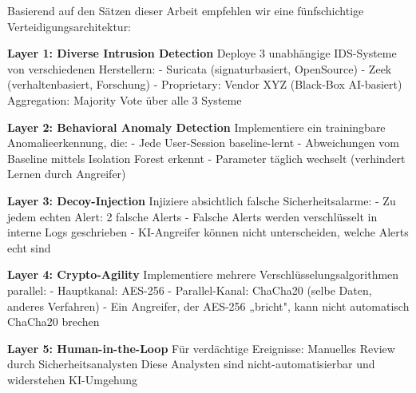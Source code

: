 \documentclass[a4paper,12pt]{article}
\theoremstyle{definition}
\begin{document}
Basierend auf den Sätzen dieser Arbeit empfehlen wir eine fünfschichtige Verteidigungsarchitektur:

\begin{algorithm}[h]
\caption{Redundante KI-resiliente Sicherheitsarchitektur für Bechtle}
\label{alg:bechtle_defense}
\begin{algorithmic}[1]
\State \textbf{Layer 1: Diverse Intrusion Detection}
\State Deploye 3 unabhängige IDS-Systeme von verschiedenen Herstellern:
\State \quad - Suricata (signaturbasiert, OpenSource)
\State \quad - Zeek (verhaltenbasiert, Forschung)
\State \quad - Proprietary: Vendor XYZ (Black-Box AI-basiert)
\State Aggregation: Majority Vote über alle 3 Systeme

\State \textbf{Layer 2: Behavioral Anomaly Detection}
\State Implementiere ein trainingbare Anomalieerkennung, die:
\State \quad - Jede User-Session baseline-lernt
\State \quad - Abweichungen vom Baseline mittels Isolation Forest erkennt
\State \quad - Parameter täglich wechselt (verhindert Lernen durch Angreifer)

\State \textbf{Layer 3: Decoy-Injection}
\State Injiziere absichtlich falsche Sicherheitsalarme:
\State \quad - Zu jedem echten Alert: 2 falsche Alerts
\State \quad - Falsche Alerts werden verschlüsselt in interne Logs geschrieben
\State \quad - KI-Angreifer können nicht unterscheiden, welche Alerts echt sind

\State \textbf{Layer 4: Crypto-Agility}
\State Implementiere mehrere Verschlüsselungsalgorithmen parallel:
\State \quad - Hauptkanal: AES-256
\State \quad - Parallel-Kanal: ChaCha20 (selbe Daten, anderes Verfahren)
\State \quad - Ein Angreifer, der AES-256 „bricht", kann nicht automatisch ChaCha20 brechen

\State \textbf{Layer 5: Human-in-the-Loop}
\State Für verdächtige Ereignisse: Manuelles Review durch Sicherheitsanalysten
\State Diese Analysten sind nicht-automatisierbar und widerstehen KI-Umgehung
\end{algorithmic}
\end{algorithm}
\end{document}

